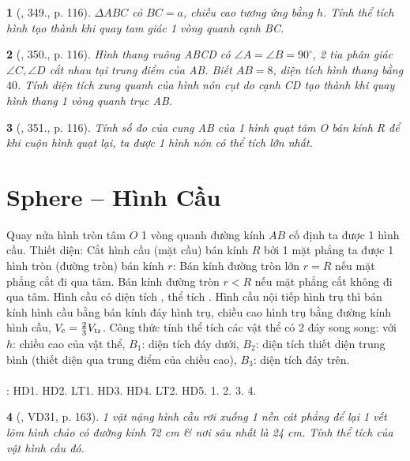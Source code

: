 \documentclass{article}
\newtheorem{baitoan}{}
\begin{document}
\begin{baitoan}[\cite{Binh_Toan_9_tap_2}, 349., p. 116]
	$\Delta ABC$ có $BC = a$, chiều cao tương ứng bằng $h$. Tính thể tích hình tạo thành khi quay tam giác 1 vòng quanh cạnh BC.
\end{baitoan}

\begin{baitoan}[\cite{Binh_Toan_9_tap_2}, 350., p. 116]
	Hình thang vuông ABCD có $\angle A = \angle B = 90^\circ$, 2 tia phân giác $\angle C,\angle D$ cắt nhau tại trung điểm của AB. Biết $AB = 8$, diện tích hình thang bằng $40$. Tính diện tích xung quanh của hình nón cụt do cạnh CD tạo thành khi quay hình thang 1 vòng quanh trục AB.
\end{baitoan}

\begin{baitoan}[\cite{Binh_Toan_9_tap_2}, 351., p. 116]
	Tính số đo của cung AB của 1 hình quạt tâm O bán kính R để khi cuộn hình quạt lại, ta được 1 hình nón có thể tích lớn nhất.
\end{baitoan}


\section{Sphere -- Hình Cầu}
 Quay nửa hình tròn tâm $O$ 1 vòng quanh đường kính $AB$ cố định ta được 1 hình cầu.  {\sf Thiết diện}: Cắt hình cầu (mặt cầu) bán kính $R$ bởi 1 mặt phẳng ta được 1 hình tròn (đường tròn) bán kính $r$: Bán kính đường tròn lớn $r = R$ nếu mặt phẳng cắt đi qua tâm. Bán kính đường tròn $r < R$ nếu mặt phẳng cắt không đi qua tâm.  Hình cầu có diện tích , thể tích .  Hình cầu nội tiếp hình trụ thì bán kính hình cầu bằng bán kính đáy hình trụ, chiều cao hình trụ bằng đường kính hình cầu, $V_{\rm c} = \frac{2}{3}V_{\rm tr}$.  Công thức tính thể tích các vật thể có 2 đáy song song:  với $h$: chiều cao của vật thể, $B_1$: diện tích đáy dưới, $B_2$: diện tích thiết diện trung bình (thiết diện qua trung điểm của chiều cao), $B_3$: diện tích đáy trên.\\
\\
\cite[Chap. X, \S3, pp. 104--108]{SGK_Toan_9_Canh_Dieu_tap_1}: HD1. HD2. LT1. HD3. HD4. LT2. HD5. 1. 2. 3. 4.

\begin{baitoan}[\cite{Tuyen_Toan_9_old}, VD31, p. 163]
	1 vật nặng hình cầu rơi xuống 1 nền cát phẳng để lại 1 vết lõm hình chảo có đường kính {\rm72 cm} \& nơi sâu nhất là {\rm24 cm}. Tính thể tích của vật hình cầu đó.
\end{baitoan}
\end{document}
